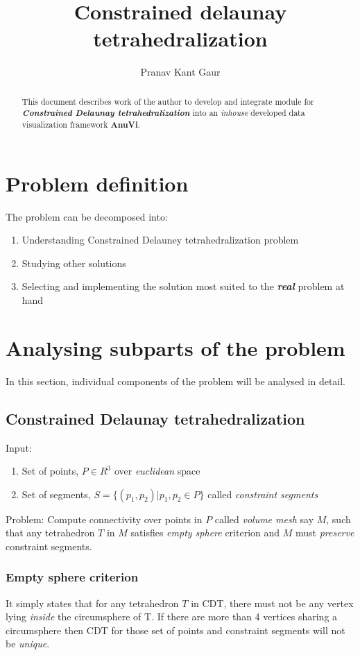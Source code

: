 \documentclass{article}
\begin{document}
\title{Constrained delaunay tetrahedralization}
\author{Pranav Kant Gaur}

\maketitle

\begin{abstract}
This document describes work of the author to develop and integrate module for \textit{\textbf{Constrained Delaunay tetrahedralization}} into an \textit{inhouse} developed data visualization framework \textbf{AnuVi}.
\end{abstract}

\section{Problem definition}
The problem can be decomposed into:
\begin{enumerate}
\item Understanding Constrained Delauney tetrahedralization problem
\item Studying other solutions
\item Selecting and implementing the solution most suited to the \textbf{\textit{real}} problem at hand
\end{enumerate}

\section{Analysing subparts of the problem}
In this section, individual components of the problem will be analysed in detail.
\subsection{Constrained Delaunay tetrahedralization}
Input: 
\begin{enumerate}
\item Set of points, $P\in R^{3}$ over \textit{euclidean} space
\item Set of segments, $S=\lbrace{(p_{1},p_{2})| p_{1},p_{2}\in P\rbrace}$ called \textit{constraint segments} 
\end{enumerate}
Problem:\newline
Compute connectivity over points in $P$ called \textit{volume mesh} say $M$, such that any tetrahedron $T$ in $M$ satisfies \textit{empty sphere} criterion and $M$ must \textit{preserve} constraint segments.

\subsubsection{Empty sphere criterion}
It simply states that for any tetrahedron $T$ in CDT, there must not be any vertex lying \textit{inside} the circumsphere of T. If there are more than 4 vertices sharing a circumsphere then CDT for those set of points and constraint segments will not be \textit{unique}.
\end{document}

